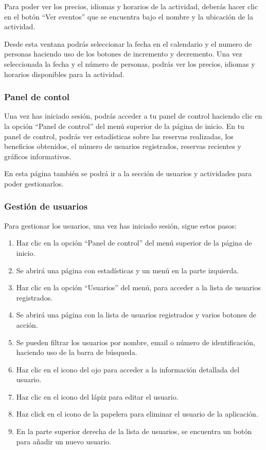 Para poder ver los precios, idiomas y horarios de la actividad, deberás hacer clic en el botón “Ver eventos” que se encuentra bajo el nombre y la ubicación de la actividad.

Desde esta ventana podrás seleccionar la fecha en el calendario y el numero de personas haciendo uso de los botones de incremento y decremento.
Una vez seleccionada la fecha y el número de personas, podrás ver los precios, idiomas y horarios disponibles para la actividad.

\subsubsection{Panel de contol}
Una vez has iniciado sesión, podrás acceder a tu panel de control haciendo clic en la opción “Panel de control” del menú superior de la página de inicio.
En tu panel de control, podrás ver estadísticas sobre las reservas realizadas, los beneficios obtenidos, el número de usuarios registrados, reservas recientes y gráficos informativos.

En esta página también se podrá ir a la sección de usuarios y actividades para poder gestionarlos.

\subsubsection{Gestión de usuarios}
Para gestionar los usuarios, una vez has iniciado sesión, sigue estos pasos:
\begin{enumerate}
	\item Haz clic en la opción “Panel de control” del menú superior de la página de inicio.
	\item Se abrirá una página con estadísticas y un menú en la parte izquierda.
	\item Haz clic en la opción “Usuarios” del menú, para acceder a la lista de usuarios registrados.
	\item Se abrirá una página con la lista de usuarios registrados y varios botones de acción.
	\item Se pueden filtrar los usuarios por nombre, email o número de identificación, haciendo uso de la barra de búsqueda.
	\item Haz clic en el icono del ojo para acceder a la información detallada del usuario.
	\item Haz clic en el icono del lápiz para editar el usuario.
	\item Haz click en el icono de la papelera para eliminar el usuario de la aplicación.
	\item En la parte superior derecha de la lista de usuarios, se encuentra un botón para añadir un nuevo usuario.
\end{enumerate}

